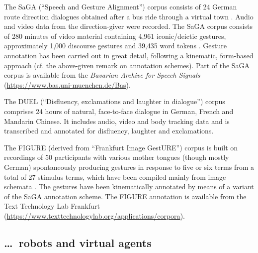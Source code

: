 \documentclass[output=paper]{langsci/langscibook}
\begin{document}
The SaGA (\enquote{Speech and Gesture Alignment}) corpus  consists of 24 German route direction dialogues obtained after a bus ride through a virtual town \citep{Luecking:Bergmann:Hahn:Kopp:Rieser:2010}. 
%
Audio and video data from the direction-giver were recorded. 
%
The SaGA corpus consists of 280 minutes of video material containing 4,961 iconic/deictic gestures, approximately 1,000 discourse gestures and 39,435 word tokens \citep{Luecking:Bergmann:Hahn:Kopp:Rieser:2013}.
%
Gesture annotation has been carried out in great detail, following a kinematic, form-based approach (cf. the above-given remark on annotation schemes).
%
Part of the SaGA corpus is available from the \textit{Bavarian Archive for Speech Signals} (\url{https://www.bas.uni-muenchen.de/Bas}).


The DUEL (\enquote{Disfluency, exclamations and laughter in dialogue}) corpus  \citep{Hough:Tian:de:Ruiter:Betz:Kousidis:Schlangen:Ginzburg:2016} comprises 24 hours of natural, face-to-face dialogue in German, French and Mandarin Chinese.
%
It includes audio, video and body tracking data and is transcribed and annotated for disfluency, laughter and exclamations.


The FIGURE (derived from \enquote{Frankfurt Image GestURE}) corpus  \citep{Luecking:Mehler:Walther:Mauri:Kurfuerst:2016} is built on recordings of 50 participants with various mother tongues (though mostly German) spontaneously producing gestures in response to five or six terms from a total of 27 stimulus terms, which have been compiled mainly from image schemata \citep{Lakoff87a-u}.
%
The gestures have been kinematically annotated by means of a variant of the SaGA annotation scheme.
%
The FIGURE annotation is available from the Text Technology Lab Frankfurt (\url{https://www.texttechnologylab.org/applications/corpora}).



\subsection{\ldots\ robots and virtual agents}
\label{sec:virtual-agents}
\end{document}
